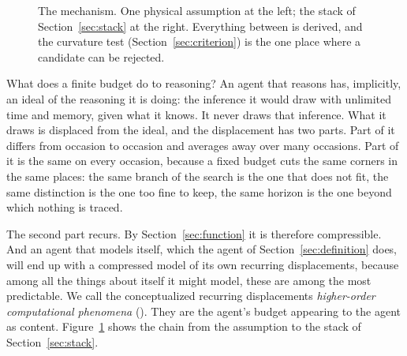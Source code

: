 \begin{figure}[t]
\centering
{}
\caption{The mechanism. One physical assumption at the left; the stack of Section~\ref{sec:stack} at the
right. Everything between is derived, and the curvature test (Section~\ref{sec:criterion}) is the one
place where a candidate can be rejected.}
\label{fig:mechanism}
\end{figure}

What does a finite budget do to reasoning? An agent that reasons has, implicitly, an ideal of the
reasoning it is doing: the inference it would draw with unlimited time and memory, given what it knows.
It never draws that inference. What it draws is displaced from the ideal, and the displacement has two
parts. Part of it differs from occasion to occasion and averages away over many occasions. Part of it is
the same on every occasion, because a fixed budget cuts the same corners in the same places: the same
branch of the search is the one that does not fit, the same distinction is the one too fine to keep, the
same horizon is the one beyond which nothing is traced.

The second part recurs. By Section~\ref{sec:function} it is therefore compressible. And an agent that
models itself, which the agent of Section~\ref{sec:definition} does, will end up with a compressed model
of its own recurring displacements, because among all the things about itself it might model, these are
among the most predictable. We call the conceptualized recurring displacements \emph{higher-order
computational phenomena} (\hocp). They are the agent's budget appearing to the agent as content.
Figure~\ref{fig:mechanism} shows the chain from the assumption to the stack of Section~\ref{sec:stack}.

